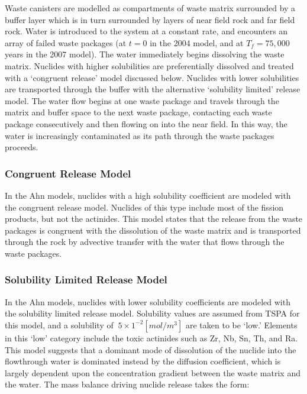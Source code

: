 Waste canisters are modelled as compartments of waste matrix 
surrounded by a buffer layer which is in turn surrounded by layers of 
near field rock and far field rock. Water is introduced to the system 
at a constant rate, and encounters an array of failed waste packages 
(at $t=0$ in the 2004 model, and at $T_f=75,000$ years in the 2007 
model). The water immediately begins dissolving the waste matrix.  
Nuclides with higher solubilities are preferentially dissolved and 
treated with a `congruent release' model discussed below. Nuclides 
with lower solubilities are transported through the buffer with the 
alternative `solubility limited' release model. The water flow begins 
at one waste package and travels through the matrix and buffer space 
to the next waste package, contacting each waste package consecutively 
and then flowing on into the near field. In this way, the water is 
increasingly contaminated as its path through the waste packages 
proceeds.  

\subsubsection{Congruent Release Model} 

In the Ahn models, nuclides with a high solubility coefficient are 
modeled with the congruent release model.  Nuclides of this type 
include most of the fission products, but not the actinides. This 
model states that the release from the waste packages is congruent 
with the dissolution of the waste matrix and is transported through 
the rock by advective transfer with the water that flows through the 
waste packages.  

\subsubsection{Solubility Limited Release Model}

In the Ahn models, nuclides with lower solubility coefficients are 
modeled with the solubility limited release model.  Solubility values 
are assumed from TSPA for this model, and a solubility of $~5\times 
1^{-2} [mol/m^3]$ are taken to be `low.' Elements in this `low' 
category include the toxic actinides such as Zr, Nb, Sn, Th, and Ra.  
This model suggests that a dominant mode of dissolution of the nuclide 
into the flowthrough water is dominated instead by the diffusion 
coefficient, which is largely dependent upon the concentration 
gradient between the waste matrix and the water. The mass balance 
driving nuclide release takes the form:

